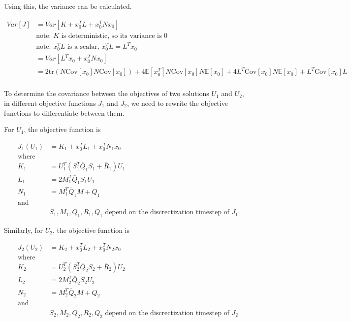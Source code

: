 \documentclass{article}
\begin{document}
Using this, the variance can be calculated.

\begin{equation}
  \begin{aligned}
    Var[J] &= Var[K + x_0^T L + x_0^T N x_0] \\
    &\text{note: $K$ is deterministic, so its variance is 0} \\
    & \text{note: $x_0^T L$ is a scalar, $x_0^T L = L^T x_0$} \\
    &= Var[L^T x_0 + x_0^T N x_0] \\
    &= 2\text{tr}(N \text{Cov}[x_0] N \text{Cov}[x_0]) + 4 \mathbb{E}[x_0^T]N\text{Cov}[x_0]N\mathbb{E}[x_0] + 4 L^T \text{Cov}[x_0] N \mathbb{E}[x_0] + L^T \text{Cov}[x_0] L \\
  \end{aligned}
\end{equation}

To determine the covariance between the objectives of two solutions $U_1$ and $U_2$, in different objective functions
$J_1$ and $J_2$, we need to rewrite the objective functions to differentiate between them.

For $U_1$, the objective function is

$$
\begin{aligned}
  J_1(U_1) &= K_1 + x_0^T L_1 + x_0^T N_1 x_0 \\
  \text{where} \\
  K_1 &= U_1^T(S_1^T \bar{Q}_1 S_1 + \bar{R}_1) U_1 \\
  L_1 &= 2 M_1^T \bar{Q}_1 S_1 U_1 \\
  N_1 &= M_1^T \bar{Q}_1 M + Q_1 \\
  \text{and} \\
  & S_1, M_1, \bar{Q}_1, \bar{R}_1, Q_1 \text{ depend on the discrectization timestep of } J_1
\end{aligned}
$$

Similarly, for $U_2$, the objective function is

$$
\begin{aligned}
  J_2(U_2) &= K_2 + x_0^T L_2 + x_0^T N_2 x_0 \\
  \text{where} \\
  K_2 &= U_2^T(S_2^T \bar{Q}_2 S_2 + \bar{R}_2) U_2 \\
  L_2 &= 2 M_2^T \bar{Q}_2 S_2 U_2 \\
  N_2 &= M_2^T \bar{Q}_2 M + Q_2 \\
  \text{and} \\
  & S_2, M_2, \bar{Q}_2, \bar{R}_2, Q_2 \text{ depend on the discrectization timestep of } J_2
\end{aligned}
$$
\end{document}
